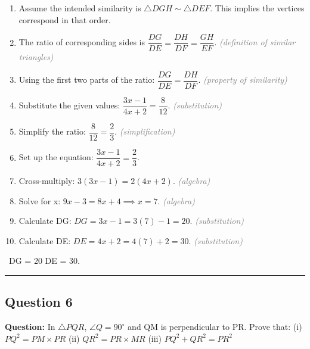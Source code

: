 \documentclass{article}
\newenvironment{steps}{%
  \begin{enumerate}[label=\textcolor{primary}{Step~\arabic*:}, leftmargin=*]
}{\end{enumerate}}
\newcommand{\dul}[1]{\uuline{#1}}
\newcommand{\reason}[1]{\hfill\textit{\textcolor{gray}{(#1)}}}
\newcommand{\solutionrule}{\par\noindent\color{accent}\rule{\linewidth}{0.6pt}\par\smallskip}
\newcommand{\finalanswer}[1]{\noindent\textbf{\textcolor{accent}{\dul{Answer:}}}~#1\solutionrule}
\begin{document}
\begin{center}
\end{center}

\begin{steps}
    \item Assume the intended similarity is $\triangle DGH \sim \triangle DEF$. This implies the vertices correspond in that order.
    \item The ratio of corresponding sides is $\dfrac{DG}{DE} = \dfrac{DH}{DF} = \dfrac{GH}{EF}$. \reason{definition of similar triangles}
    \item Using the first two parts of the ratio: $\dfrac{DG}{DE} = \dfrac{DH}{DF}$. \reason{property of similarity}
    \item Substitute the given values: $\dfrac{3x - 1}{4x + 2} = \dfrac{8}{12}$. \reason{substitution}
    \item Simplify the ratio: $\dfrac{8}{12} = \dfrac{2}{3}$. \reason{simplification}
    \item Set up the equation: $\dfrac{3x - 1}{4x + 2} = \dfrac{2}{3}$.
    \item Cross-multiply: $3(3x - 1) = 2(4x + 2)$. \reason{algebra}
    \item Solve for x: $9x - 3 = 8x + 4 \implies x = 7$. \reason{algebra}
    \item Calculate DG: $DG = 3x - 1 = 3(7) - 1 = 20$. \reason{substitution}
    \item Calculate DE: $DE = 4x + 2 = 4(7) + 2 = 30$. \reason{substitution}
\end{steps}

\finalanswer{DG = 20  DE = 30.}

\subsection*{Question 6}
\textbf{Question:} In $\triangle PQR$, $\angle Q = 90^\circ$ and QM is perpendicular to PR. Prove that:
(i) $PQ^2 = PM \times PR$
(ii) $QR^2 = PR \times MR$
(iii) $PQ^2 + QR^2 = PR^2$
\end{document}
